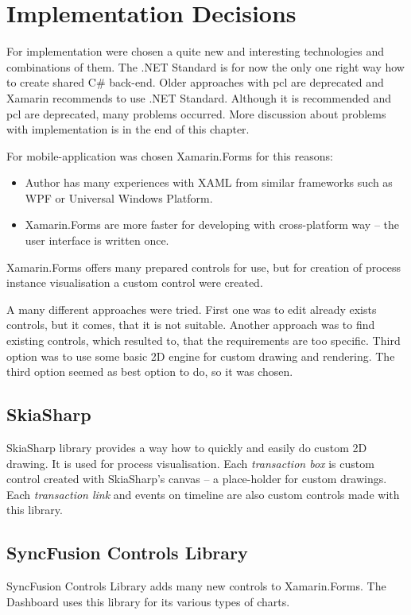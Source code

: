 \section{Implementation Decisions}
For implementation were chosen a quite new and interesting technologies and combinations of them.
The .NET Standard is for now the only one right way how to create shared C\# back-end. Older approaches with \gls{pcl} are deprecated and Xamarin recommends to use .NET Standard. Although it is recommended and \gls{pcl} are deprecated, many problems occurred. More discussion about problems with implementation is in the end of this chapter.

For mobile-application was chosen Xamarin.Forms for this reasons:
\begin{itemize}
\item Author has many experiences with XAML from similar frameworks such as WPF or Universal Windows Platform.
\item Xamarin.Forms are more faster for developing with cross-platform way -- the user interface is written once.
\end{itemize}

Xamarin.Forms offers many prepared controls for use, but for creation of process instance visualisation a custom control were created.  

A many different approaches were tried. First one was to edit already exists controls, but it comes, that it is not suitable. Another approach was to find existing controls, which resulted to, that the requirements are too specific. Third option was to use some basic 2D engine for custom drawing and rendering. The third option seemed as best option to do, so it was chosen. 
\subsection{SkiaSharp}
SkiaSharp library \cite{skiasharp} provides a way how to quickly and easily do custom 2D drawing. It is used for process visualisation. Each \textit{transaction box} is custom control created with SkiaSharp's canvas -- a place-holder for custom drawings. Each \textit{transaction link} and events on timeline are also custom controls made with this library. 
\subsection{SyncFusion Controls Library}
SyncFusion Controls Library \cite{syncfusion} adds many new controls to Xamarin.Forms. The Dashboard uses this library for its various types of charts. 
